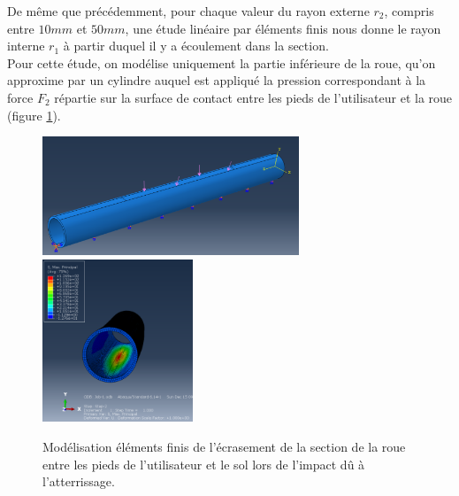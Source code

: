 De même que précédemment, pour chaque valeur du rayon externe $r_2$, compris entre $10 mm$ et $50 mm$, une étude linéaire par éléments finis nous donne le rayon interne $r_1$ à partir duquel il y a écoulement dans la section. \\
Pour cette étude, on modélise uniquement la partie inférieure de la roue, qu'on approxime par un cylindre auquel est appliqué la pression correspondant à la force $F_2$ répartie sur la surface de contact entre les pieds de l'utilisateur et la roue (figure \ref{fig:ecrasement}).

 \begin{figure}[h]
\centering
\includegraphics[width=290]{saut2/elf4.PNG}
\includegraphics[width=170]{saut2/elf5.PNG}
\caption{Modélisation éléments finis de l'écrasement de la section de la roue entre les pieds de l'utilisateur et le sol lors de l'impact dû à l'atterrissage.}
\label{fig:ecrasement}
\end{figure}

